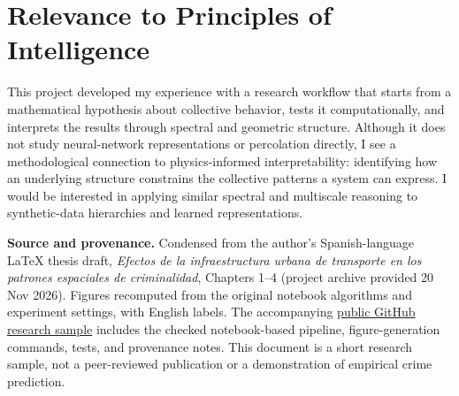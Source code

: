 \documentclass[10pt,letterpaper]{article}
\begin{document}
\section*{Relevance to Principles of Intelligence}
This project developed my experience with a research workflow that starts from a mathematical hypothesis about collective behavior, tests it computationally, and interprets the results through spectral and geometric structure. Although it does not study neural-network representations or percolation directly, I see a methodological connection to physics-informed interpretability: identifying how an underlying structure constrains the collective patterns a system can express. I would be interested in applying similar spectral and multiscale reasoning to synthetic-data hierarchies and learned representations.

\vfill
\noindent\color{gray}\footnotesize\textbf{Source and provenance.} Condensed from the author's Spanish-language LaTeX thesis draft, \emph{Efectos de la infraestructura urbana de transporte en los patrones espaciales de criminalidad}, Chapters 1--4 (project archive provided 20 Nov 2026). Figures recomputed from the original notebook algorithms and experiment settings, with English labels. The accompanying \href{https://github.com/ChristianJFG/small_world_criminality/tree/research-application-2026}{public GitHub research sample} includes the checked notebook-based pipeline, figure-generation commands, tests, and provenance notes. This document is a short research sample, not a peer-reviewed publication or a demonstration of empirical crime prediction.\par
\end{document}
